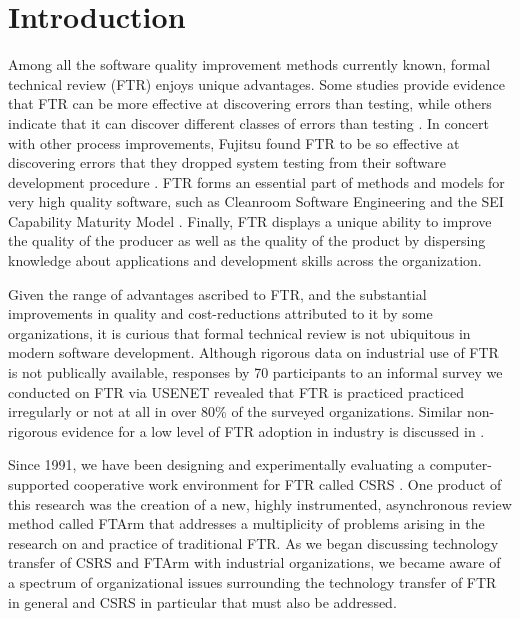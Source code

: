\thispagestyle{empty}

\section{Introduction}

Among all the software quality improvement methods currently known, formal
technical review 
%
(FTR)
%
enjoys unique advantages.  Some studies provide evidence that FTR can be
more effective at discovering errors than testing, while others indicate
that it can discover different classes of errors than testing
\cite{Myers78,Basili86}.  In concert with other process improvements,
Fujitsu found FTR to be so effective at discovering errors that they
dropped system testing from their software development procedure
\cite{Arthur93}.  FTR forms an essential part of methods and models for
very high quality software, such as Cleanroom Software Engineering
\cite{Linger93} and the SEI Capability Maturity Model \cite{Paulk93a}.
Finally, FTR displays a unique ability to improve the quality of the
producer as well as the quality of the product by dispersing knowledge
about applications and development skills across the organization.

Given the range of advantages ascribed to FTR, and the substantial
improvements in quality and cost-reductions attributed to it by some
organizations, it is curious that formal technical review is not ubiquitous
in modern software development.  Although rigorous data on industrial use
of FTR is not publically available, responses by 70 participants to an
informal survey we conducted on FTR via USENET revealed that FTR is
practiced practiced irregularly or not at all in over 80\% of the surveyed
organizations.  Similar non-rigorous evidence for a low level of FTR
adoption in industry is discussed in \cite{Brykczynski94}.

Since 1991, we have been designing and experimentally evaluating a
computer-supported cooperative work environment for FTR called CSRS
\cite{Johnson94,Johnson93,Johnson93b}.  One product of this research was
the creation of a new, highly instrumented, asynchronous review method
called FTArm that addresses a multiplicity of problems arising in the
research on and practice of traditional FTR.  As we began discussing
technology transfer of CSRS and FTArm with industrial organizations, we
became aware of a spectrum of organizational issues surrounding the
technology transfer of FTR in general and CSRS in particular that must also
be addressed.

